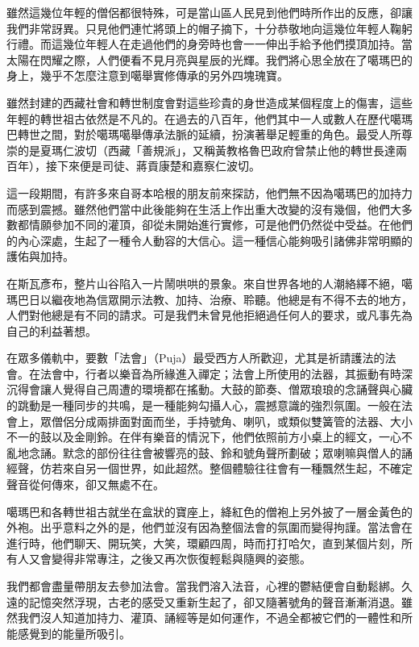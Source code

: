 雖然這幾位年輕的僧侶都很特殊，可是當山區人民見到他們時所作出的反應，卻讓我們非常訝異。只見他們連忙將頭上的帽子摘下，十分恭敬地向這幾位年輕人鞠躬行禮。而這幾位年輕人在走過他們的身旁時也會一一伸出手給予他們摸頂加持。當太陽在閃耀之際，人們便看不見月亮與星辰的光輝。我們將心思全放在了噶瑪巴的身上，幾乎不怎麼注意到噶舉實修傳承的另外四塊瑰寶。

雖然封建的西藏社會和轉世制度會對這些珍貴的身世造成某個程度上的傷害，這些年輕的轉世祖古依然是不凡的。在過去的八百年，他們其中一人或數人在歷代噶瑪巴轉世之間，對於噶瑪噶舉傳承法脈的延續，扮演著舉足輕重的角色。最受人所尊崇的是夏瑪仁波切（西藏「善規派」，又稱黃教格魯巴政府曾禁止他的轉世長達兩百年），接下來便是司徒、蔣貢康楚和嘉察仁波切。

這一段期間，有許多來自哥本哈根的朋友前來探訪，他們無不因為噶瑪巴的加持力而感到震撼。雖然他們當中此後能夠在生活上作出重大改變的沒有幾個，他們大多數都情願參加不同的灌頂，卻從未開始進行實修，可是他們仍然從中受益。在他們的內心深處，生起了一種令人動容的大信心。這一種信心能夠吸引諸佛非常明顯的護佑與加持。

在斯瓦彥布，整片山谷陷入一片鬧哄哄的景象。來自世界各地的人潮絡繹不絕，噶瑪巴日以繼夜地為信眾開示法教、加持、治療、聆聽。他總是有不得不去的地方，人們對他總是有不同的請求。可是我們未曾見他拒絕過任何人的要求，或凡事先為自己的利益著想。

在眾多儀軌中，要數「法會」（Puja）最受西方人所歡迎，尤其是祈請護法的法會。在法會中，行者以樂音為所緣進入禪定；法會上所使用的法器，其振動有時深沉得會讓人覺得自己周遭的環境都在搖動。大鼓的節奏、僧眾琅琅的念誦聲與心臟的跳動是一種同步的共鳴，是一種能夠勾攝人心，震撼意識的強烈氛圍。一般在法會上，眾僧侶分成兩排面對面而坐，手持號角、喇叭，或類似雙簧管的法器、大小不一的鼓以及金剛鈴。在伴有樂音的情況下，他們依照前方小桌上的經文，一心不亂地念誦。默念的部份往往會被響亮的鼓、鈴和號角聲所劃破；眾喇嘛與僧人的誦經聲，仿若來自另一個世界，如此超然。整個體驗往往會有一種飄然生起，不確定聲音從何傳來，卻又無處不在。

噶瑪巴和各轉世祖古就坐在盒狀的寶座上，絳紅色的僧袍上另外披了一層金黃色的外袍。出乎意料之外的是，他們並沒有因為整個法會的氛圍而變得拘謹。當法會在進行時，他們聊天、開玩笑，大笑，環顧四周，時而打打哈欠，直到某個片刻，所有人又會變得非常專注，之後又再次恢復輕鬆與隨興的姿態。

我們都會盡量帶朋友去參加法會。當我們溶入法音，心裡的鬱結便會自動鬆綁。久遠的記憶突然浮現，古老的感受又重新生起了，卻又隨著號角的聲音漸漸消退。雖然我們沒人知道加持力、灌頂、誦經等是如何運作，不過全都被它們的一體性和所能感覺到的能量所吸引。

